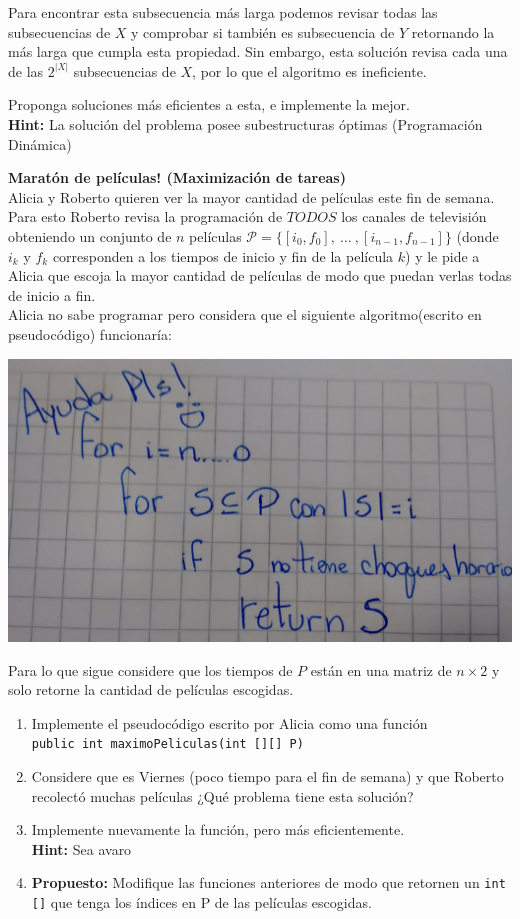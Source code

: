 \documentclass[dcc]{fcfmcourse}
\begin{document}
\begin{problems}
Para encontrar esta subsecuencia más larga podemos revisar todas las subsecuencias de $X$ y comprobar si también es subsecuencia de $Y$ retornando la más larga que cumpla esta propiedad. Sin embargo, esta solución revisa cada una de las $2^{|X|}$ subsecuencias de $X$, por lo que el algoritmo es ineficiente.

Proponga soluciones más eficientes a esta, e implemente la mejor.\\
\textbf{Hint:} La solución del problema posee subestructuras óptimas (Programación Dinámica)


\problem \textbf{Maratón de películas! (Maximización de tareas)}\\
Alicia y Roberto quieren ver la mayor cantidad de películas este fin de semana. Para esto Roberto revisa la programación de $TODOS$ los canales de televisión obteniendo un conjunto de $n$ películas $\mathcal{P} =\lbrace [i_{0},f_{0}],\ \ldots \ , [i_{n-1},f_{n-1}] \rbrace$ (donde $i_{k}$ y $f_{k}$ corresponden a los tiempos de inicio y fin de la película $k$) y le pide a Alicia que escoja la mayor cantidad de películas de modo que puedan verlas todas de inicio a fin.\\

Alicia no sabe programar pero considera que el siguiente algoritmo(escrito en pseudocódigo) funcionaría:
\begin{center}
\includegraphics[scale=0.18]{Algoritmo.jpg}
\end{center}
Para lo que sigue considere que los tiempos de $P$ están en una matriz de $n \times 2$ y solo retorne la cantidad de películas escogidas.
\begin{enumerate}
    \item Implemente el pseudocódigo escrito por Alicia como una función\\ \texttt{public int maximoPeliculas(int [][] P)}
    \item Considere que es Viernes (poco tiempo para el fin de semana) y que Roberto recolectó muchas películas ¿Qué problema tiene esta solución?
    \item Implemente nuevamente la función, pero más eficientemente.\\
    \textbf{Hint:} Sea avaro
    \item \textbf{Propuesto:} Modifique las funciones anteriores de modo que retornen un \texttt{int []} que tenga los índices en P de las películas escogidas.
\end{enumerate}
\end{problems}
\end{document}
